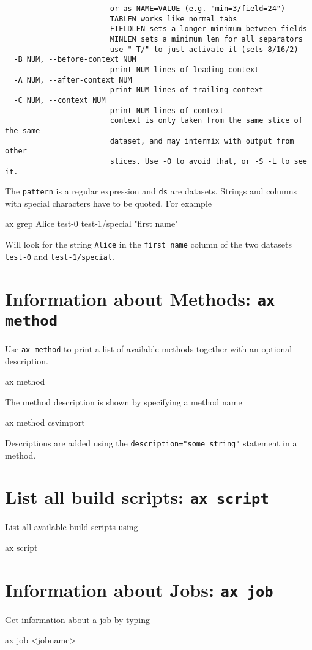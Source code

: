 \begin{snugshade}
\begin{verbatim}
                        or as NAME=VALUE (e.g. "min=3/field=24")
                        TABLEN works like normal tabs
                        FIELDLEN sets a longer minimum between fields
                        MINLEN sets a minimum len for all separators
                        use "-T/" to just activate it (sets 8/16/2)
  -B NUM, --before-context NUM
                        print NUM lines of leading context
  -A NUM, --after-context NUM
                        print NUM lines of trailing context
  -C NUM, --context NUM
                        print NUM lines of context
                        context is only taken from the same slice of the same
                        dataset, and may intermix with output from other
                        slices. Use -O to avoid that, or -S -L to see it.
\end{verbatim}
\end{snugshade}
\noindent The \texttt{pattern} is a regular expression and \texttt{ds} are
datasets.  Strings and columns with special characters have to be quoted.
For example
\begin{shell}
ax grep Alice test-0 test-1/special "first name"
\end{shell}
Will look for the string \texttt{Alice} in the \texttt{first name} column of
the two datasets \texttt{test-0} and \texttt{test-1/special}.


\section{Information about Methods: \texttt{ax method}}
Use \texttt{ax method} to print a list of available methods together
with an optional description.
\begin{shell}
ax method
\end{shell}
The method description is shown by specifying a method name
\begin{shell}
ax method csvimport
\end{shell}
Descriptions are added using the \texttt{description="some string"}
statement in a method.


\section{List all build scripts: \texttt{ax script}}
List all available build scripts using
\begin{shell}
ax script
\end{shell}


\section{Information about Jobs: \texttt{ax job}}
Get information about a job by typing
\begin{shell}
ax job <jobname>
\end{shell}


